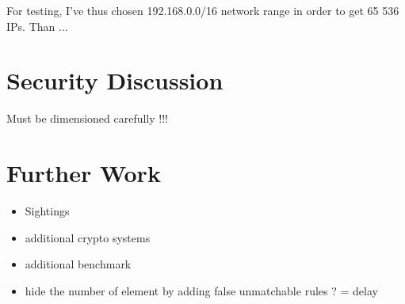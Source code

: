 \documentclass{eplmastersthesis}
\begin{document}
For testing, I've thus chosen 192.168.0.0/16 network range in order to get 65 536 IPs. Than ...


\section{Security Discussion}
Must be dimensioned carefully !!! 

\section{Further Work}
\begin{itemize}
\item Sightings
\item additional crypto systems
\item additional benchmark
\item hide the number of element by adding false unmatchable rules ?  = delay
\end{itemize}


\newpage


\newpage

\backcoverpage
\end{document}
